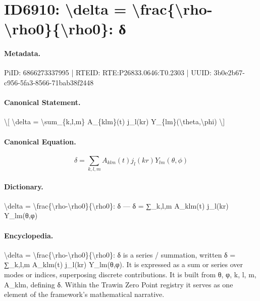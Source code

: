 \section*{ID6910: \textbackslash{}delta = \textbackslash{}frac\{\textbackslash{}rho-\textbackslash{}rho0\}\{\textbackslash{}rho0\}: δ}
\paragraph{Metadata.}
PiID: 6866273337995 | RTEID: RTE:P26833.0646:T0.2303 | UUID: 3b0e2b67-c956-5fa3-8566-71bab38f2448

\paragraph{Canonical Statement.}
\textbackslash{}[ \textbackslash{}delta = \textbackslash{}sum\_\{k,l,m\} A\_\{klm\}(t) j\_l(kr) Y\_\{lm\}(\textbackslash{}theta,\textbackslash{}phi) \textbackslash{}]

\paragraph{Canonical Equation.}
\[
\delta = \sum_{k,l,m} A_{klm}(t) j_l(kr) Y_{lm}(\theta,\phi)
\]

\paragraph{Dictionary.}
\textbackslash{}delta = \textbackslash{}frac\{\textbackslash{}rho-\textbackslash{}rho0\}\{\textbackslash{}rho0\}: δ — δ = ∑\_k,l,m A\_klm(t) j\_l(kr) Y\_lm(θ,φ)

\paragraph{Encyclopedia.}
\textbackslash{}delta = \textbackslash{}frac\{\textbackslash{}rho-\textbackslash{}rho0\}\{\textbackslash{}rho0\}: δ is a series / summation, written δ = ∑\_k,l,m A\_klm(t) j\_l(kr) Y\_lm(θ,φ). It is expressed as a sum or series over modes or indices, superposing discrete contributions. It is built from θ, φ, k, l, m, A\_klm, defining δ. Within the Trawin Zero Point registry it serves as one element of the framework's mathematical narrative.
